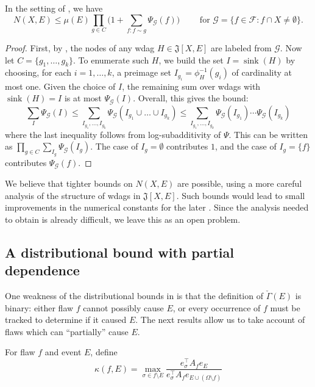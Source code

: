 \documentclass{toc}
\DeclareMathOperator{\sink}{sink}
\begin{document}
\begin{corollary}
\label{perm-thmaa}
In the setting of , we have $$
N(X,E) \leq \mu(E) \prod_{g \in C} \bigl(1 + \sum_{f: f \sim g} \Psi_{\mathcal G}(f) \bigr) \qquad \text{ for $\mathcal G = \{f  \in \mathcal F: f \cap X \neq \emptyset \}$}.
$$ 
\end{corollary}
\begin{proof}
First, by ,  the nodes of any wdag $H \in \mathfrak J[X,E]$ are labeled from $\mathcal G$.  Now let $C = \{g_1, \dots, g_k \}$. To enumerate such $H$, we build the set $I = \sink(H)$ by choosing, for each $i = 1, \dots, k$, a preimage set $I_{g_i} = \phi^{-1}_H(g_i)$ of cardinality at most one.  Given the choice of $I$, the remaining sum  over wdags with $\sink(H) = I$ is at most $\Psi_{\mathcal G}(I)$. Overall, this gives the bound:
$$
\sum_{I} \Psi_{\mathcal G}(I) \leq \sum_{I_{g_1}, \dots, I_{g_k} } \Psi_{\mathcal G} ( I_{g_1} \cup \dots \cup I_{g_k}) \leq  \sum_{I_{g_1}, \dots, I_{g_k} } \Psi_{\mathcal G}( I_{g_1} ) \cdots \Psi_{\mathcal G}(I_{g_k})
$$ 
where the last inequality follows from log-subadditivity of $\Psi$. This can be written as $\prod_{g \in C} \sum_{I_g} \Psi_{\mathcal G}(I_{g})$. The case of $I_{g} = \emptyset$ contributes $1$, and the case of $I_{g} = \{f \}$ contributes $\Psi_{\mathcal G}(f)$. 
\end{proof}
 
 We believe that tighter bounds on $N(X,E)$ are possible, using a more careful analysis of the structure of wdags in $\mathfrak J[X,E]$. Such bounds would lead to small improvements in the numerical constants for the later . Since the analysis needed to obtain  is already difficult, we leave this as an open problem.

\subsection{A distributional bound with partial dependence}
One weakness of the distributional bounds in  is that the definition of $\check \Gamma(E)$ is binary: either flaw $f$ cannot possibly cause $E$, or every occurrence of $f$ must be tracked to determine if it caused $E$. The next results allow us to take account of flaws which can ``partially'' cause $E$.

For flaw $f$ and event $E$, define $$
\kappa(f, E) = \max_{\sigma \in f \setminus E} \frac{e_{\sigma}^{\top} A_f e_E}{e_{\sigma}^{\top} A_f e_{E \cup (\Omega \setminus f)}}
$$
\end{document}
